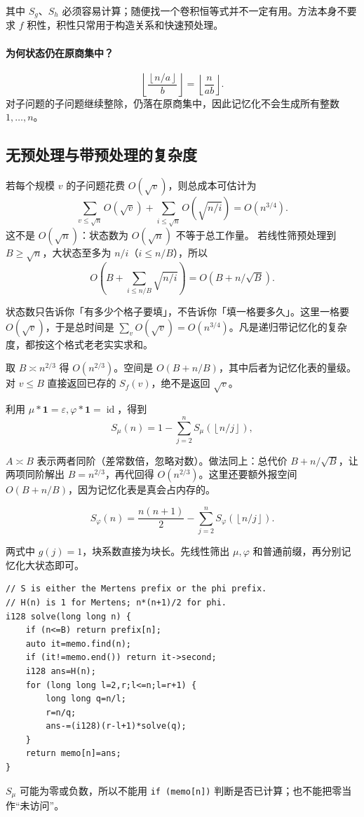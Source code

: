 \documentclass[UTF8,a4paper,11pt,twoside,openright,fontset=fandol]{ctexbook}
\theoremstyle{definition}
\newcommand{\eps}{\varepsilon}
\newcommand{\one}{\mathbf 1}
\newcommand{\id}{\operatorname{id}}
\newcommand{\floor}[1]{\left\lfloor #1\right\rfloor}
\begin{document}
其中 $S_g$、$S_h$ 必须容易计算；随便找一个卷积恒等式并不一定有用。方法本身不要求 $f$ 积性，积性只常用于构造关系和快速预处理。

\paragraph{为何状态仍在原商集中？}
\[
\floor{\frac{\floor{n/a}}b}=\floor{\frac n{ab}}.
\]
对子问题的子问题继续整除，仍落在原商集中，因此记忆化不会生成所有整数 $1,\ldots,n$。

\subsection{无预处理与带预处理的复杂度}
若每个规模 $v$ 的子问题花费 $O(\sqrt v)$，则总成本可估计为
\[
 \sum_{v\le\sqrt n}O(\sqrt v)
 +\sum_{i\le\sqrt n}O(\sqrt{n/i})=O(n^{3/4}).
\]
这不是 $O(\sqrt n)$：状态数为 $O(\sqrt n)$ 不等于总工作量。
若线性筛预处理到 $B\ge\sqrt n$，大状态至多为 $n/i$（$i\le n/B$），所以
\[
 O\left(B+\sum_{i\le n/B}\sqrt{n/i}\right)
 =O(B+n/\sqrt B).
\]

\begin{tip}
状态数只告诉你「有多少个格子要填」，不告诉你「填一格要多久」。这里一格要 $O(\sqrt v)$，于是总时间是 $\sum_{v}O(\sqrt v)=O(n^{3/4})$。凡是递归带记忆化的复杂度，都按这个格式老老实实求和。
\end{tip}

取 $B\asymp n^{2/3}$ 得 $O(n^{2/3})$。空间是 $O(B+n/B)$，其中后者为记忆化表的量级。对 $v\le B$ 直接返回已存的 $S_f(v)$，绝不是返回 $\sqrt v$。


利用 $\mu*\one=\eps,\varphi*\one=\id$，得到
\[
 S_\mu(n)=1-\sum_{j=2}^n S_\mu(\floor{n/j}),
\]

\begin{tip}[$\asymp$ 与「平衡」]
$A\asymp B$ 表示两者同阶（差常数倍，忽略对数）。做法同上：总代价 $B+n/\sqrt B$，让两项同阶解出 $B=n^{2/3}$，再代回得 $O(n^{2/3})$。这里还要额外报空间 $O(B+n/B)$，因为记忆化表是真会占内存的。
\end{tip}

\[
 S_\varphi(n)=\frac{n(n+1)}2-\sum_{j=2}^nS_\varphi(\floor{n/j}).
\]

两式中 $g(j)=1$，块系数直接为块长。先线性筛出 $\mu,\varphi$ 和普通前缀，再分别记忆化大状态即可。
\begin{lstlisting}
// S is either the Mertens prefix or the phi prefix.
// H(n) is 1 for Mertens; n*(n+1)/2 for phi.
i128 solve(long long n) {
    if (n<=B) return prefix[n];
    auto it=memo.find(n);
    if (it!=memo.end()) return it->second;
    i128 ans=H(n);
    for (long long l=2,r;l<=n;l=r+1) {
        long long q=n/l;
        r=n/q;
        ans-=(i128)(r-l+1)*solve(q);
    }
    return memo[n]=ans;
}
\end{lstlisting}
$S_\mu$ 可能为零或负数，所以不能用 \texttt{if (memo[n])} 判断是否已计算；也不能把零当作“未访问”。
\end{document}
